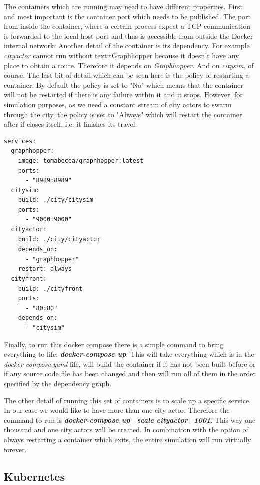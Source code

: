 \documentclass[conference]{IEEEtran}
\begin{document}
The containers which are running may need to have different properties. First and most important is the container port which needs to be published. The port from inside the container, where a certain process expect a TCP communication is forwarded to the local host port and thus is accessible from outside the Docker internal network. Another detail of the container is its dependency. For example \textit{cityactor} cannot run without textit{Graphhopper} because it doesn't have any place to obtain a route. Therefore it depends on \textit{Graphhopper}. And on \textit{citysim}, of course. The last bit of detail which can be seen here is the policy of restarting a container. By default the policy is set to "No" which means that the container will not be restarted if there is any failure within it and it stops. However, for simulation purposes, as we need a constant stream of city actors to swarm through the city, the policy is set to "Always" which will restart the container after if closes itself, i.e. it finishes its travel.

\begin{lstlisting}[caption=Docker-compose file, label=lst:dockercompose]
services:
  graphhopper:
    image: tomabecea/graphhopper:latest
    ports:
      - "8989:8989"
  citysim:
    build: ./city/citysim
    ports:
      - "9000:9000"
  cityactor:
    build: ./city/cityactor
    depends_on: 
      - "graphhopper"
    restart: always
  cityfront:
    build: ./cityfront
    ports:
      - "80:80"
    depends_on:
      - "citysim"
\end{lstlisting}

Finally, to run this docker compose there is a simple command to bring everything to life: \textit{\textbf{docker-compose up}}. This will take everything which is in the \textit{docker-compose.yaml} file, will build the container if it has not been built before or if any source code file has been changed and then will run all of them in the order specified by the dependency graph.

The other detail of running this set of containers is to scale up a specific service. In our case we would like to have more than one city actor. Therefore the command to run is \textit{\textbf{docker-compose up --scale cityactor=1001}}. This way one thousand and one city actors will be created. In combination with the option of always restarting a container which exits, the entire simulation will run virtually forever.

\subsection{Kubernetes}
\label{subsec:kubernetes}
\end{document}
